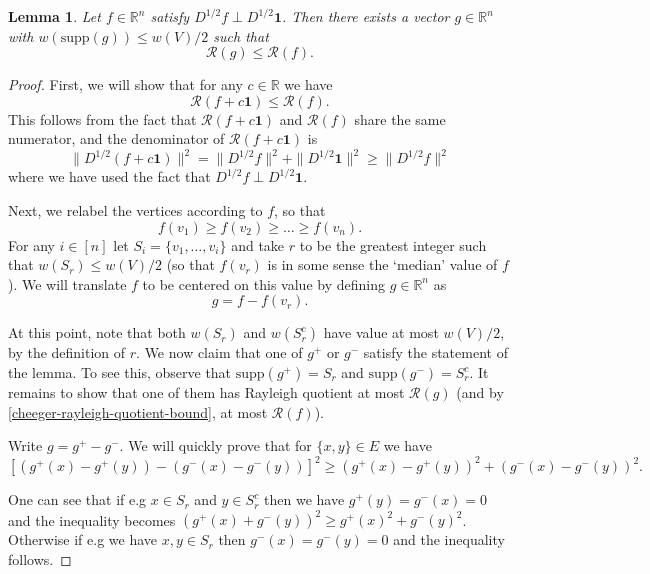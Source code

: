 \documentclass[a4paper,11pt]{article}
\newtheorem{lemma}[theorem]{Lemma}
\theoremstyle{definition}
\newcommand{\R}{\mathbb{R}}
\newcommand{\rayleigh}[1]{\mathcal{R}\left(#1\right)}
\newcommand{\supp}[1]{\mathrm{supp}\left(#1\right)}
\begin{document}
\begin{lemma}\label{cheeger-round}
Let $f \in \R^n$ satisfy $D^{1/2}f \perp D^{1/2}\bm{1}$. Then there exists a vector $g \in \R^n$ with $w(\supp{g}) \le w(V)/2$ such that
\[
\rayleigh{g} \le \rayleigh{f}.
\]
\end{lemma}
\begin{proof}

First, we will show that for any $c \in \R$ we have
\begin{equation}\label{cheeger-rayleigh-quotient-bound}
\rayleigh{f + c\bm{1}} \le \rayleigh{f}.
\end{equation}
This follows from the fact that $\rayleigh{f + c\bm{1}}$ and $\rayleigh{f}$ share the same numerator, and the denominator of $\rayleigh{f + c\bm{1}}$ is
\[\|D^{1/2}(f + c\bm{1})\|^2 = \|D^{1/2}f\|^2 + \|D^{1/2}\bm{1}\|^2 \ge \|D^{1/2}f\|^2\]
where we have used the fact that $D^{1/2}f \perp D^{1/2}\bm{1}$.

\medskip

Next, we relabel the vertices according to $f$, so that
\[
f(v_1) \ge f(v_2) \ge \dots \ge f(v_n).
\]
For any $i \in [n]$ let $S_i = \{v_1, \dots, v_i\}$ and take $r$ to be the greatest integer such that $w(S_r) \le w(V)/2$ (so that $f(v_r)$ is in some sense the `median' value of $f$). We will translate $f$ to be centered on this value by defining $g \in \R^n$ as
\[
g = f - f(v_r).
\]

At this point, note that both $w(S_r)$ and $w(S^c_r)$ have value at most $w(V)/2$, by the definition of $r$. We now claim that one of $g^+$ or $g^-$ satisfy the statement of the lemma. To see this, observe that $\supp{g^+} = S_r$ and $\supp{g^-} = S^c_r$. It remains to show that one of them has Rayleigh quotient at most $\rayleigh{g}$ (and by \eqref{cheeger-rayleigh-quotient-bound}, at most $\rayleigh{f}$).

Write $g = g^+ - g^-$. We will quickly prove that for $\{x, y\} \in E$ we have
\begin{equation}\label{cheeger-edge-cut}
[(g^+(x) - g^+(y)) - (g^-(x) - g^-(y))]^2 \ge (g^+(x) - g^+(y))^2 + (g^-(x) - g^-(y))^2.
\end{equation}

One can see that if e.g $x \in S_r$ and $y \in S^c_r$ then we have $g^+(y) = g^-(x) = 0$ and the inequality becomes $(g^+(x) + g^-(y))^2 \ge g^+(x)^2 + g^-(y)^2$. Otherwise if e.g we have $x, y \in S_r$ then $g^-(x) = g^-(y) = 0$ and the inequality follows.


\end{proof}
\end{document}
